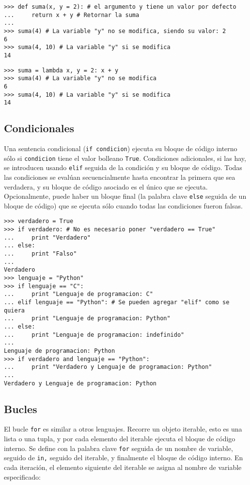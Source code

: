 \documentclass{article}
\begin{document}
\begin{lstlisting}
>>> def suma(x, y = 2): # el argumento y tiene un valor por defecto
...     return x + y # Retornar la suma
...
>>> suma(4) # La variable "y" no se modifica, siendo su valor: 2
6
>>> suma(4, 10) # La variable "y" si se modifica
14
\end{lstlisting}


\begin{lstlisting}
>>> suma = lambda x, y = 2: x + y
>>> suma(4) # La variable "y" no se modifica
6
>>> suma(4, 10) # La variable "y" si se modifica
14
\end{lstlisting}

\subsection{Condicionales}
 Una sentencia condicional (\verb~if condicion~) ejecuta su bloque de código interno sólo si \verb~condicion~ tiene el valor bolleano \verb~True~.  Condiciones adicionales, si las hay, se introducen usando \verb~elif~ seguida de la condición y su bloque de código. Todas las condiciones se evalúan secuencialmente hasta encontrar la primera que sea verdadera, y su bloque de código asociado es el único que se ejecuta. Opcionalmente, puede haber un bloque final (la palabra clave \verb~else~ seguida de un bloque de código) que se ejecuta sólo cuando todas las condiciones fueron falsas.



\begin{lstlisting}
>>> verdadero = True
>>> if verdadero: # No es necesario poner "verdadero == True"
...     print "Verdadero"
... else:
...     print "Falso"
...
Verdadero
>>> lenguaje = "Python"
>>> if lenguaje == "C": 
...     print "Lenguaje de programacion: C"
... elif lenguaje == "Python": # Se pueden agregar "elif" como se quiera
...     print "Lenguaje de programacion: Python"
... else: 
...     print "Lenguaje de programacion: indefinido"
...
Lenguaje de programacion: Python
>>> if verdadero and lenguaje == "Python": 
...     print "Verdadero y Lenguaje de programacion: Python"
...
Verdadero y Lenguaje de programacion: Python
\end{lstlisting}






\subsection{Bucles}
El bucle \verb~for~ es similar a  otros lenguajes. Recorre un objeto iterable, esto es  una lista o una tupla, y por cada elemento del iterable ejecuta el bloque de código interno. Se define con la palabra clave \verb~for~ seguida de un nombre de variable, seguido de \verb~in,~ seguido del iterable, y finalmente el bloque de código interno. En cada iteración, el elemento siguiente del iterable se asigna al nombre de variable especificado:
\end{document}
